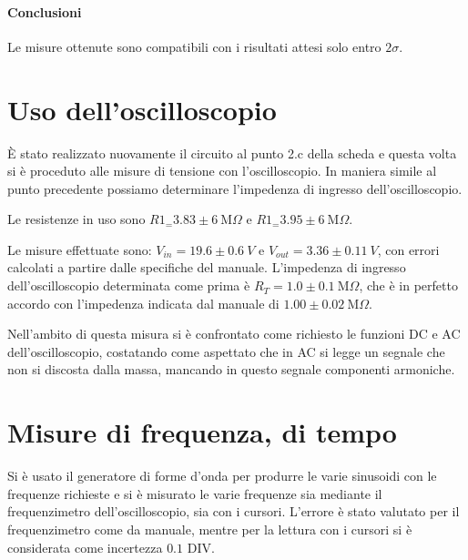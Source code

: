 \documentclass[10pt,a4paper]{article}
\newcommand\ohm{\Omega}
\begin{document}
\paragraph{Conclusioni} Le misure ottenute sono compatibili con i risultati attesi solo entro $2 \sigma$. 


\section{Uso dell'oscilloscopio}
È stato realizzato nuovamente il circuito al punto 2.c della scheda e questa volta si è proceduto alle misure di tensione con l'oscilloscopio. In maniera simile al punto precedente possiamo determinare l'impedenza di ingresso dell'oscilloscopio.

Le resistenze in uso sono $R1_=3.83 \pm 6~\text{M}\ohm$ e  $R1_=3.95 \pm 6~\text{M}\ohm$.

Le misure effettuate sono: $V_{in}=19.6 \pm 0.6 ~V$ e $V_{out}= 3.36 \pm 0.11 ~ V$, con errori calcolati a partire dalle specifiche del manuale. L'impedenza di ingresso dell'oscilloscopio determinata come prima è $R_T=1.0 \pm 0.1 ~ \text{M}\ohm$, che è in perfetto accordo con l'impedenza indicata dal manuale di $1.00 \pm 0.02 ~\text{M} \ohm$.

Nell'ambito di questa misura si è confrontato come richiesto le funzioni DC e AC dell'oscilloscopio, costatando come aspettato che in AC si legge un segnale che non si discosta dalla massa, mancando in questo segnale componenti armoniche.

\section{Misure di frequenza, di tempo}

Si è usato il generatore di forme d'onda per produrre le varie sinusoidi con le frequenze richieste e si è misurato le varie frequenze sia mediante il frequenzimetro dell'oscilloscopio, sia con i cursori.
L'errore è stato valutato per il frequenzimetro come da manuale, mentre per la lettura con i cursori si è considerata come incertezza $0.1$ DIV.


\end{document}
